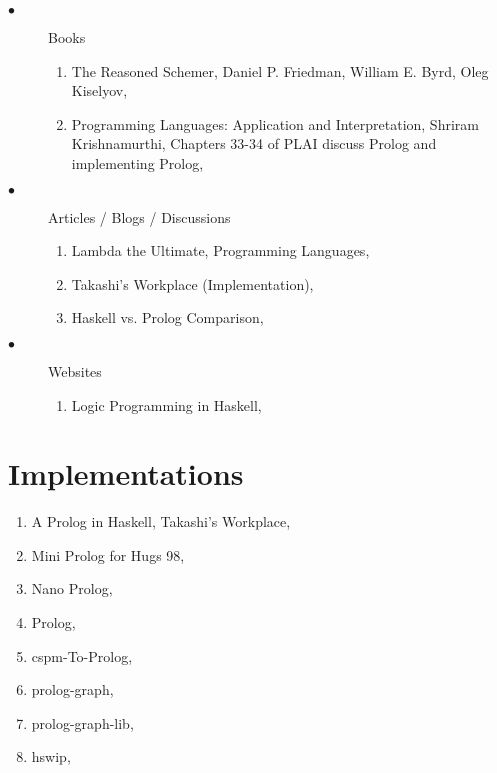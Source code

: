 \documentclass[thesis-solanki.tex]{subfiles}
\begin{document}
\begin{description}
\item[$\bullet$] Books
\begin{enumerate}
\item  The Reasoned Schemer, Daniel P. Friedman, William E. Byrd, Oleg Kiselyov, \cite{friedman05reasoned}

\item Programming Languages: Application and Interpretation, Shriram Krishnamurthi, Chapters 33-34 of PLAI discuss Prolog and implementing Prolog, \cite{krishnamurthi2007programming}

\end{enumerate}

\item[$\bullet$] Articles / Blogs / Discussions
\begin{enumerate}
\item Lambda the Ultimate, Programming Languages, \cite{website:lambda-the-ultimate}

\item Takashi's Workplace (Implementation), \cite{website:takashi-workplace}

\item Haskell vs. Prolog Comparison, \cite{website:stackoverflow}
 
\end{enumerate}

\item[$\bullet$] Websites
\begin{enumerate}

\item Logic Programming in Haskell, \cite{website:logic-programming-haskell}

\end{enumerate}

\end{description}


\section{Implementations}
\begin{enumerate}
\item A Prolog in Haskell, Takashi's Workplace, \cite{website:takashi-workplace}

\item Mini Prolog for Hugs 98, \cite{website:mini-prolog-hugs98}

\item Nano Prolog, \cite{nanoprolog-lib}

\item Prolog, \cite{prolog-lib}

\item cspm-To-Prolog, \cite{cspm-To-Prolog-lib}

\item prolog-graph, \cite{prolog-graph-lib}

\item prolog-graph-lib, \cite{prolog-graph-lib-lib}

\item hswip, \cite{hswip-lib}

\end{enumerate}
\end{document}
